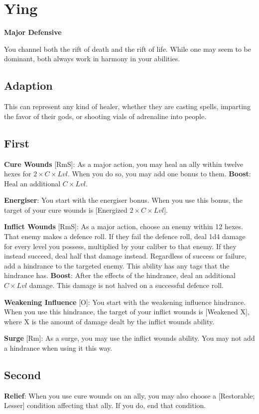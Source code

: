 \section{Ying}
\textbf{Major Defensive}

You channel both the rift of death and the rift of life. While one may seem to be dominant, both always work in harmony in your abilities.

\subsection*{Adaption}
This can represent any kind of healer, whether they are casting spells, imparting the favor of their gods, or shooting vials of adrenaline into people.

\begin{multicols*}{2}
\subsection*{First \Facet\perk}
\textbf{Cure Wounds} [RmS]: As a major action, you may heal an ally within twelve hexes for $2 \times C \times Lvl$. When you do so, you may add one bonus to them. \textbf{Boost}: Heal an additional $C \times Lvl$.

\textbf{Energiser}: You start with the energiser bonus. When you use this bonus, the target of your cure wounds is [Energized $2 \times C \times Lvl$].

\textbf{Inflict Wounds} [RmS]: As a major action, choose an enemy within 12 hexes. That enemy makes a defence roll. If they fail the defence roll, deal 1d4 damage for every level you possess, multiplied by your caliber to that enemy. If they instead succeed, deal half that damage instead. Regardless of success or failure, add a hindrance to the targeted enemy. This ability has any tags that the hindrance has. \textbf{Boost}: After the effects of the hindrance, deal an additional $C \times Lvl$ damage. This damage is not halved on a successful defence roll.

\textbf{Weakening Influence} [O]: You start with the weakening influence hindrance. When you use this hindrance, the target of your inflict wounds is [Weakened X], where X is the amount of damage dealt by the inflict wounds ability.

\textbf{Surge} [Rm]: As a surge, you may use the inflict wounds ability. You may not add a hindrance when using it this way.


\subsection*{Second \Facet\perk}
\textbf{Relief}: When you use cure wounds on an ally, you may also choose a [Restorable; Lesser] condition affecting that ally. If you do, end that condition.


\end{multicols*}
